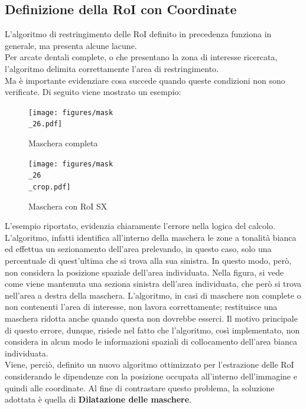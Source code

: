 \documentclass[12pt,a4paper,openright,twoside]{book}
\begin{document}
\subsection{Definizione della RoI con Coordinate}
L'algoritmo di restringimento delle RoI definito in precedenza funziona in generale, ma presenta alcune lacune.\\
Per arcate dentali complete, o che presentano la zona di interesse ricercata, l'algoritmo delimita correttamente l'area di restringimento.\\
Ma è importante evidenziare cosa succede quando queste condizioni non sono verificate. Di seguito viene mostrato un esempio:
\begin{figure}[H]
    \centering
    \begin{minipage}{0.45\textwidth}
	\centering
    	\texttt{[image: figures/mask\\\_26.pdf]}
    	\caption{Maschera completa}
    	\label{lab:Maschera completa}
    \end{minipage}\hfill
    \begin{minipage}{0.45\textwidth}
    	\centering
    	\texttt{[image: figures/mask\\\_26\\\_crop.pdf]}
    	\caption{Maschera con RoI SX}
    	\label{lab:Maschera con RoI sx}
    \end{minipage}\hfill
\end{figure}
 
L'esempio riportato, evidenzia chiaramente l'errore nella logica del calcolo. L'algoritmo, infatti identifica all'interno della maschera le zone a tonalità bianca ed effettua un sezionamento dell'area prelevando, in questo caso, solo una percentuale di quest'ultima che si trova alla sua sinistra. In questo modo, però, non considera la posizione spaziale dell'area individuata. Nella figura, si vede come viene mantenuta una seziona sinistra dell'area individuata, che però si trova nell'area a destra della maschera. L'algoritmo, in casi di maschere non complete o non contenenti l'area di interesse, non lavora correttamente; restituisce una maschera ridotta anche quando questa non dovrebbe esserci. Il motivo principale di questo errore, dunque, risiede nel fatto che l'algoritmo, così implementato, non considera in alcun modo le informazioni spaziali di collocamento dell'area bianca individuata.\\

Viene, perciò, definito un nuovo algoritmo ottimizzato per l'estrazione delle RoI considerando le dipendenze con la posizione occupata all'interno dell'immagine e quindi alle coordinate.
Al fine di contrastare questo problema, la soluzione adottata è quella di \textbf{Dilatazione delle maschere}.
\begin{figure}[H]
    \centering
    
\end{figure}
\end{document}
